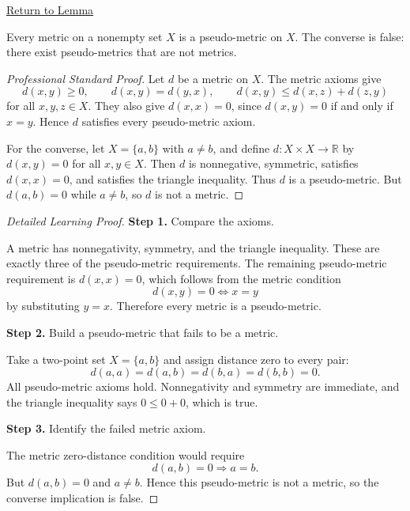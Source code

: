 \newpage
{}
\label{prf:metrics-are-pseudo-metrics}

\begin{remark*}[Return]
\hyperref[lem:metrics-are-pseudo-metrics]{Return to Lemma}
\end{remark*}

\begin{lemma*}
Every metric on a nonempty set \(X\) is a pseudo-metric on \(X\).
The converse is false: there exist pseudo-metrics that are not metrics.
\end{lemma*}

\begin{proof}[Professional Standard Proof]
\LRAProofBodyStart
Let \(d\) be a metric on \(X\).  The metric axioms give
\[
d(x,y)\geq 0,\qquad d(x,y)=d(y,x),\qquad
d(x,y)\leq d(x,z)+d(z,y)
\]
for all \(x,y,z\in X\).  They also give \(d(x,x)=0\), since
\(d(x,y)=0\) if and only if \(x=y\).  Hence \(d\) satisfies every
pseudo-metric axiom.

For the converse, let \(X=\{a,b\}\) with \(a\neq b\), and define
\(d:X\times X\to\mathbb{R}\) by \(d(x,y)=0\) for all \(x,y\in X\).
Then \(d\) is nonnegative, symmetric, satisfies \(d(x,x)=0\), and
satisfies the triangle inequality.  Thus \(d\) is a pseudo-metric.
But \(d(a,b)=0\) while \(a\neq b\), so \(d\) is not a metric.
\end{proof}

\begin{proof}[Detailed Learning Proof]
\LRAProofBodyStart

\textbf{Step 1.} Compare the axioms.

A metric has nonnegativity, symmetry, and the triangle inequality.  These are
exactly three of the pseudo-metric requirements.  The remaining pseudo-metric
requirement is \(d(x,x)=0\), which follows from the metric condition
\[
  d(x,y)=0 \Longleftrightarrow x=y
\]
by substituting \(y=x\).  Therefore every metric is a pseudo-metric.

\textbf{Step 2.} Build a pseudo-metric that fails to be a metric.

Take a two-point set \(X=\{a,b\}\) and assign distance zero to every pair:
\[
  d(a,a)=d(a,b)=d(b,a)=d(b,b)=0.
\]
All pseudo-metric axioms hold.  Nonnegativity and symmetry are immediate, and
the triangle inequality says \(0\leq 0+0\), which is true.

\textbf{Step 3.} Identify the failed metric axiom.

The metric zero-distance condition would require
\[
  d(a,b)=0 \Longrightarrow a=b.
\]
But \(d(a,b)=0\) and \(a\neq b\).  Hence this pseudo-metric is not a metric,
so the converse implication is false.
\end{proof}

